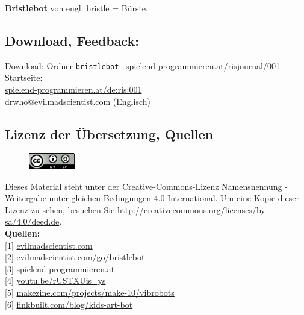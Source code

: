 \textbf{Bristlebot} von engl. bristle = Bürste. \\


\subsection*{Download, Feedback:}
\footnotesize{
Download: Ordner \texttt{bristlebot} \Mundus\ \href{http://spielend-programmieren.at/risjournal/001}{spielend-programmieren.at/risjournal/001}\\
Startseite:\\
\href{http://spielend-programmieren.at/de:ris:001}{spielend-programmieren.at/de:ris:001}\\ 
\Letter\:  drwho@evilmadscientist.com (Englisch) \\}
\normalsize
 

\subsection*{Lizenz der Übersetzung, Quellen}
\begin{figure}
\includegraphics[width=2cm]{ccbysa88x31.png}
\end{figure}
Dieses Material steht unter der Creative-Commons-Lizenz Namensnennung - Weitergabe unter gleichen Bedingungen 4.0 International. Um eine Kopie dieser Lizenz zu sehen, besuchen Sie \url{http://creativecommons.org/licenses/by-sa/4.0/deed.de}. \\

\textbf{Quellen:}\\
{[}1{]} \href{http://www.evilmadscientist.com/about/}{evilmadscientist.com} \\
{[}2{]} \href{http://www.evilmadscientist.com/go/bristlebot}{evilmadscientist.com/go/bristlebot} \\
{[}3{]} \href{http://spielend-programmieren.at}{spielend-programmieren.at} \\
{[}4{]} \href{http://youtu.be/rUSTXUis_ys}{youtu.be/rUSTXUis\_ys} \\
{[}5{]} \href{http://makezine.com/projects/make-10/vibrobots/}{makezine.com/projects/make-10/vibrobots} \\
{[}6{]} \href{http://www.finkbuilt.com/blog/kids-art-bot/}{finkbuilt.com/blog/kids-art-bot} 

